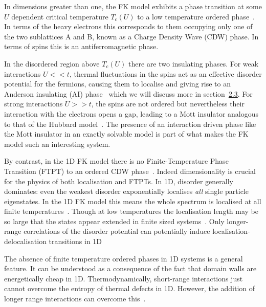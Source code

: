 In dimensions greater than one, the FK model exhibits a phase transition at some \(U\) dependent critical temperature \(T_c(U)\) to a low temperature ordered phase~\autocite{maskaThermodynamicsTwodimensionalFalicovKimball2006}. In terms of the heavy electrons this corresponds to them occupying only one of the two sublattices A and B, known as a Charge Density Wave (CDW) phase. In terms of spins this is an antiferromagnetic phase.

In the disordered region above \(T_c(U)\) there are two insulating phases. For weak interactions \(U << t\), thermal fluctuations in the spins act as an effective disorder potential for the fermions, causing them to localise and giving rise to an Anderson insulating (AI) phase~\autocite{andersonAbsenceDiffusionCertain1958} which we will discuss more in section~\protect\hyperlink{bg-disorder-and-localisation}{2.3}. For strong interactions \(U >> t\), the spins are not ordered but nevertheless their interaction with the electrons opens a gap, leading to a Mott insulator analogous to that of the Hubbard model~\autocite{brandtThermodynamicsCorrelationFunctions1989}. The presence of an interaction driven phase like the Mott insulator in an exactly solvable model is part of what makes the FK model such an interesting system.

By contrast, in the 1D FK model there is no Finite-Temperature Phase Transition (FTPT) to an ordered CDW phase~\autocite{liebAbsenceMottTransition1968}. Indeed dimensionality is crucial for the physics of both localisation and FTPTs. In 1D, disorder generally dominates: even the weakest disorder exponentially localises \emph{all} single particle eigenstates. In the 1D FK model this means the whole spectrum is localised at all finite temperatures~\autocite{goldshteinPurePointSpectrum1977,abrahamsScalingTheoryLocalization1979,kramerLocalizationTheoryExperiment1993}. Though at low temperatures the localisation length may be so large that the states appear extended in finite sized systems~\autocite{antipovInteractionTunedAndersonMott2016}. Only longer-range correlations of the disorder potential can potentially induce localisation-delocalisation transitions in 1D~\autocite{aubryAnalyticityBreakingAnderson1980,dassarmaLocalizationMobilityEdges1990,dunlapAbsenceLocalizationRandomdimer1990}

The absence of finite temperature ordered phases in 1D systems is a general feature. It can be understood as a consequence of the fact that domain walls are energetically cheap in 1D. Thermodynamically, short-range interactions just cannot overcome the entropy of thermal defects in 1D. However, the addition of longer range interactions can overcome this~\autocite{peierlsIsingModelFerromagnetism1936,kennedyItinerantElectronModel1986}.

